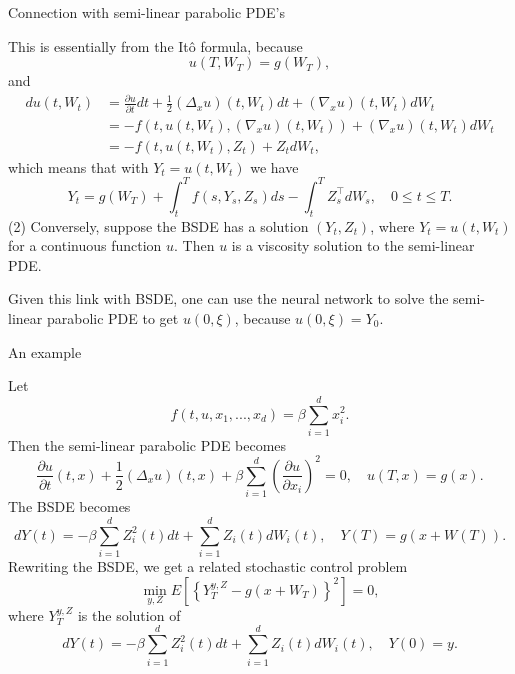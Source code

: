\documentclass{beamer}
\begin{document}
\begin{frame}{Connection with semi-linear parabolic PDE's}

    {\footnotesize \footnotesize
    This is essentially from the Itô formula, because
    \[
    u(T,W_{T}) = g(W_{T}),
    \]
    and
    \begin{align*}
        du(t,W_{t}) &= \frac{\partial u}{\partial t}dt + \frac{1}{2}(\Delta_{x}u)(t,W_{t})dt + (\nabla_{x}u)(t,W_{t})dW_{t}
        \\ & = -f(t,u(t,W_{t}),(\nabla_{x}u)(t,W_{t})) + (\nabla_{x}u)(t,W_{t})dW_{t}
        \\ &= -f(t,u(t,W_{t}),Z_{t}) + Z_{t}dW_{t},
    \end{align*}
     \pause which means that with \(Y_{t} = u(t,W_{t})\) we have
    \[
    Y_{t} = g(W_{T}) + \int_{t}^{T}f(s,Y_{s},Z_{s})ds - \int_{t}^{T}Z_{s}^{\top}dW_{s}, \quad 0 \leq t \leq T.
    \]
     \pause (2) Conversely, suppose the BSDE has a solution \((Y_{t},Z_{t})\), where $Y_{t} = u(t,W_{t})$
    for a continuous function \(u\). Then \(u\) is a viscosity solution to the 
    semi-linear PDE.
    \vspace{1em}
    \par Given this link with BSDE, one can use the neural network to solve 
    the semi-linear parabolic PDE to get \(u(0,\xi)\), because $u(0,\xi) = Y_{0}.$
    }
    
\end{frame}

\begin{frame}{An example}

    {\footnotesize \footnotesize
     Let
\[
f(t, u, x_1, ..., x_d) = \beta \sum_{i=1}^d x_i^2.
\]
Then the semi-linear parabolic PDE becomes
\[
\frac{\partial u}{\partial t}(t, x) + \frac{1}{2}(\Delta_x u)(t, x) + 
\beta \sum_{i=1}^d \left( \frac{\partial u}{\partial x_i} \right)^2 = 0, \quad u(T, x) = g(x). 
\]
 \pause The BSDE becomes
\[
dY(t) = -\beta \sum_{i=1}^d Z_i^2(t) dt + \sum_{i=1}^d Z_i(t) dW_i(t), \quad Y(T) = g(x + W(T)).
\]
 \pause Rewriting the BSDE, we get a related stochastic control problem
\[
\min_{y, Z} E \left[ \left\{ Y_T^{y, Z} - g(x + W_T) \right\}^2 \right] = 0,
\]
where \( Y_T^{y,Z} \) is the solution of
\[
dY(t) = -\beta \sum_{i=1}^d Z_i^2(t)dt + \sum_{i=1}^d Z_i(t)dW_i(t), \quad Y(0) = y.
\]
    }
    
\end{frame}
\end{document}

